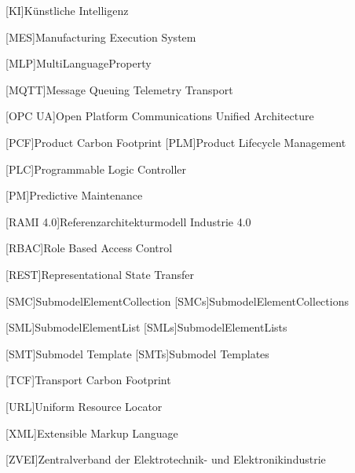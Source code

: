{\begin{acronym}[RAMI 4.0]
[KI]{Künstliche Intelligenz}

[MES]{Manufacturing Execution System}

[MLP]{MultiLanguageProperty}

[MQTT]{Message Queuing Telemetry Transport}

[OPC UA]{Open Platform Communications Unified Architecture}

[PCF]{Product Carbon Footprint}
[PLM]{Product Lifecycle Management}

[PLC]{Programmable Logic Controller}

[PM]{Predictive Maintenance}

[RAMI 4.0]{Referenzarchitekturmodell Industrie 4.0}

[RBAC]{Role Based Access Control}

[REST]{Representational State Transfer}

[SMC]{SubmodelElementCollection}
[SMCs]{SubmodelElementCollections}

[SML]{SubmodelElementList}
[SMLs]{SubmodelElementLists}

[SMT]{Submodel Template}
[SMTs]{Submodel Templates}

[TCF]{Transport Carbon Footprint}

[URL]{Uniform Resource Locator}

[XML]{Extensible Markup Language}

[ZVEI]{Zentralverband der Elektrotechnik- und Elektronikindustrie}
\end{acronym}
}

\newpage